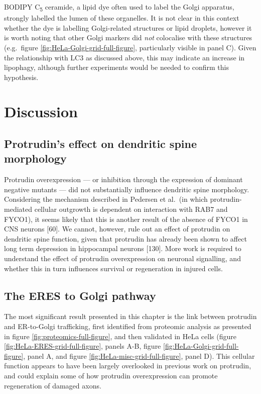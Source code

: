 \documentclass[
  12pt,
  a4paper,
]{book}
\begin{document}
BODIPY C\textsubscript{5} ceramide, a lipid dye often used to label the Golgi apparatus, strongly labelled the lumen of these organelles. It is not clear in this context whether the dye is labelling Golgi-related structures or lipid droplets, however it is worth noting that other Golgi markers did \emph{not} colocalise with these structures (e.g.~figure \ref{fig:HeLa-Golgi-grid-full-figure}, particularly visible in panel C). Given the relationship with LC3 as discussed above, this may indicate an increase in lipophagy, although further experiments would be needed to confirm this hypothesis.

\hypertarget{discussion}{%
\section{Discussion}\label{discussion}}

\hypertarget{protrudins-effect-on-dendritic-spine-morphology}{%
\subsection{Protrudin's effect on dendritic spine morphology}\label{protrudins-effect-on-dendritic-spine-morphology}}

Protrudin overexpression --- or inhibition through the expression of dominant negative mutants --- did not substantially influence dendritic spine morphology. Considering the mechanism described in Pedersen et al.~(in which protrudin-mediated cellular outgrowth is dependent on interaction with RAB7 and FYCO1), it seems likely that this is another result of the absence of FYCO1 in CNS neurons {[}60{]}. We cannot, however, rule out an effect of protrudin on dendritic spine function, given that protrudin has already been shown to affect long term depression in hippocampal neurons {[}130{]}. More work is required to understand the effect of protrudin overexpression on neuronal signalling, and whether this in turn influences survival or regeneration in injured cells.

\hypertarget{the-eres-to-golgi-pathway}{%
\subsection{The ERES to Golgi pathway}\label{the-eres-to-golgi-pathway}}

The most significant result presented in this chapter is the link between protrudin and ER-to-Golgi trafficking, first identified from proteomic analysis as presented in figure \ref{fig:proteomics-full-figure}, and then validated in HeLa cells (figure \ref{fig:HeLa-ERES-grid-full-figure}, panels A-B, figure \ref{fig:HeLa-Golgi-grid-full-figure}, panel A, and figure \ref{fig:HeLa-misc-grid-full-figure}, panel D). This cellular function appears to have been largely overlooked in previous work on protrudin, and could explain some of how protrudin overexpression can promote regeneration of damaged axons.
\end{document}
